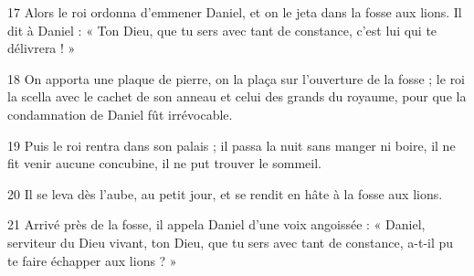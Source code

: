 
17 Alors le roi ordonna d’emmener Daniel, et on le jeta dans la fosse aux lions. Il dit à Daniel : « Ton Dieu, que tu sers avec tant de constance, c’est lui qui te délivrera ! »

18 On apporta une plaque de pierre, on la plaça sur l’ouverture de la fosse ; le roi la scella avec le cachet de son anneau et celui des grands du royaume, pour que la condamnation de Daniel fût irrévocable.

19 Puis le roi rentra dans son palais ; il passa la nuit sans manger ni boire, il ne fit venir aucune concubine, il ne put trouver le sommeil.

20 Il se leva dès l’aube, au petit jour, et se rendit en hâte à la fosse aux lions.

21 Arrivé près de la fosse, il appela Daniel d’une voix angoissée : « Daniel, serviteur du Dieu vivant, ton Dieu, que tu sers avec tant de constance, a-t-il pu te faire échapper aux lions ? »
